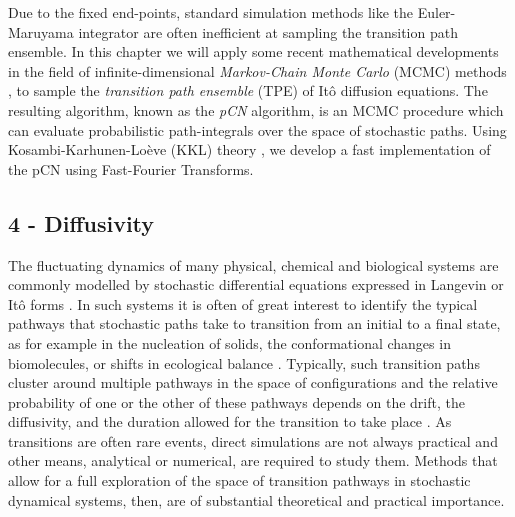 \documentclass[withindex,glossary,techreport]{cam-thesis}
\begin{document}
Due to the fixed end-points, standard simulation methods like the Euler-Maruyama integrator \citep{kloedenNumericalSolutionStochastic2011} are often inefficient at sampling the transition path ensemble. In this chapter we will apply some recent mathematical developments in the field of infinite-dimensional \textit{Markov-Chain Monte Carlo} (MCMC) methods \citep{cotterMCMCMethodsFunctions2013, beskosMCMCMETHODSDIFFUSION2008, hairerAnalysisSPDEsArising2005, hairerAnalysisSPDEsArising2007, hairerSpectralGapsMetropolis2014}, to sample the \textit{transition path ensemble} (TPE) of Itô diffusion equations. The resulting algorithm, known as the \textit{pCN} algorithm, is an MCMC procedure which can evaluate probabilistic path-integrals over the space of stochastic paths. Using Kosambi-Karhunen-Lo\`eve (KKL) theory \citep{kosambiParallelismPathspaces, karhunenUeberLineareMethoden1947, loeveProbabilityTheory1977}, we develop a fast implementation of the pCN using Fast-Fourier Transforms.

\subsection{4 - Diffusivity}

The fluctuating dynamics of many physical, chemical and biological
systems are commonly modelled by stochastic differential equations
expressed in Langevin or Itô forms \citep{kampenStochasticProcessesPhysics2011,gardinerStochasticMethodsHandbook2010,riskenFokkerPlanckEquationMethods2012,bharucha-reidElementsTheoryMarkov2012}.
In such systems it is often of great interest to identify the typical
pathways that stochastic paths take to transition from an initial
to a final state, as for example in the nucleation of solids, the
conformational changes in biomolecules, or shifts in ecological balance
\citep{faccioliDominantPathwaysProtein2006, demarcoPhaseTransitionModel2001, gardnerConstructionGeneticToggle2000, mangelBarrierTransitionsDriven1994, wolynesNavigatingFoldingRoutes1995, huangMolecularMathematicalBasis2012, paninskiMostLikelyVoltage2006, noltingBallsCupsQuasipotentials2016, leeFindingMultipleReaction2017}.
Typically, such transition paths cluster around multiple pathways
in the space of configurations and the relative probability of one
or the other of these pathways depends on the drift, the diffusivity,
and the duration allowed for the transition to take place \citep{onsagerFluctuationsIrreversibleProcesses1953,bachFunctionalsPathsDiffusion1977,itoProbabilisticConstructionLagrangean1978,ikedaStochasticDifferentialEquations2014}.
As transitions are often rare events, direct simulations are not always
practical and other means, analytical or numerical, are required to
study them. Methods that allow for a full exploration of the space
of transition pathways in stochastic dynamical systems, then, are
of substantial theoretical and practical importance.
\end{document}
